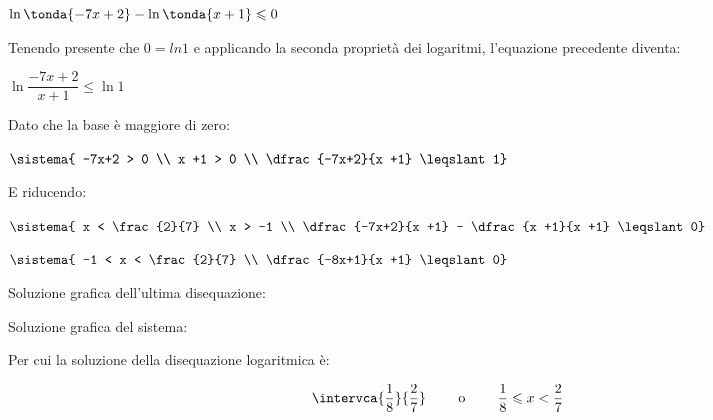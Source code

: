 \begin{esempio}
 \(\ln \tonda{-7x+2} - \ln \tonda{x +1} \leqslant 0\)
 
Tenendo presente che \(0 = ln 1\) e applicando la seconda proprietà 
dei logaritmi, l'equazione precedente diventa:

\(\ln \dfrac{-7x+2}{x +1} \leqslant \ln 1\)

Dato che la base è maggiore di zero:

\(\sistema{
-7x+2 > 0 \\
x +1 > 0 \\
\dfrac{-7x+2}{x +1} \leqslant 1}\)

E riducendo:

\(\sistema{
x < \frac{2}{7} \\
x > -1 \\
\dfrac{-7x+2}{x +1} - \dfrac{x +1}{x +1} \leqslant 0}\)

\(\sistema{
-1 < x < \frac{2}{7} \\
\dfrac{-8x+1}{x +1} \leqslant 0}\)

\noindent
\begin{minipage}{.48\textwidth}
\vspace*{-12pt}
Soluzione grafica dell'ultima disequazione:

\begin{inaccessibleblock}
  \disfratta
\end{inaccessibleblock}
\end{minipage}
\hspace{.04\textwidth}
\begin{minipage}{.48\textwidth}
Soluzione grafica del sistema:

\begin{inaccessibleblock}
  \dissistema
\end{inaccessibleblock}
\end{minipage}

Per cui la soluzione della disequazione logaritmica è:

\[\intervca{\frac{1}{8}}{\frac{2}{7}} \qquad \text{ o } \qquad 
  \frac{1}{8} \leqslant x < \frac{2}{7}\]

\end{esempio}







































